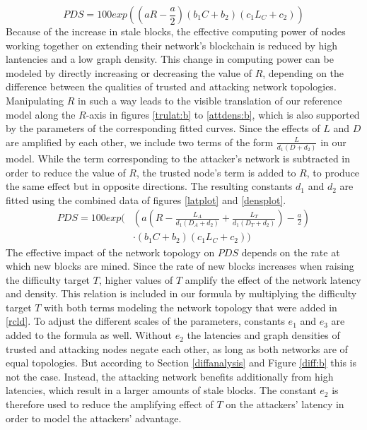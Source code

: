 \documentclass[a4paper,12pt,twoside]{report}
\begin{document}
\begin{equation}\label{rcl}
PDS = 100 exp \left( \left( a R- \frac{a}{2} \right) \left( b_1C+b_2 \right) \left( c_1L_C+c_2 \right) \right)
\end{equation}
Because of the increase in stale blocks, the effective computing power of nodes working together on extending their network's blockchain is reduced by high lantencies and a low graph density. This change in computing power can be modeled by directly increasing or decreasing the value of $R$, depending on the difference between the qualities of trusted and attacking network topologies. Manipulating $R$ in such a way leads to the visible translation of our reference model along the $R$-axis in figures \ref{trulat:b} to \ref{attdens:b}, which is also supported by the parameters of the corresponding fitted curves. Since the effects of $L$ and $D$ are amplified by each other, we include two terms of the form $\frac{L}{d_1(D+d_2)}$ in our model. While the term corresponding to the attacker's network is subtracted in order to reduce the value of $R$, the trusted node's term is added to $R$, to produce the same effect but in opposite directions. The resulting constants $d_1$ and $d_2$ are fitted using the combined data of figures \ref{latplot} and \ref{densplot}.
\begin{equation}\label{rcld}
\begin{split}
PDS = 100 exp \Biggl( & \left( a \left( R-\frac{ L_A}{d_1 \left( D_A+d_2 \right)}+\frac{ L_T}{d_1 \left( D_T+d_2 \right)} \right) - \frac{a}{2} \right) \\
           & \cdot \left( b_1C+b_2 \right) \left( c_1L_C+c_2 \right) \Biggr)
\end{split}
\end{equation}
The effective impact of the network topology on $PDS$ depends on the rate at which new blocks are mined. Since the rate of new blocks increases when raising the difficulty target $T$, higher values of $T$ amplify the effect of the network latency and density. This relation is included in our formula by multiplying the difficulty target $T$ with both terms modeling the network topology that were added in \autoref{rcld}. To adjust the different scales of the parameters, constants $e_1$ and $e_3$ are added to the formula as well. Without $e_2$ the latencies and graph densities of trusted and attacking nodes negate each other, as long as both networks are of equal topologies. But according to Section \ref{diffanalysis} and Figure \ref{diff:b} this is not the case. Instead, the attacking network benefits additionally from high latencies, which result in a larger amounts of stale blocks. The constant $e_2$ is therefore used to reduce the amplifying effect of $T$ on the attackers' latency in order to model the attackers' advantage.
\end{document}

